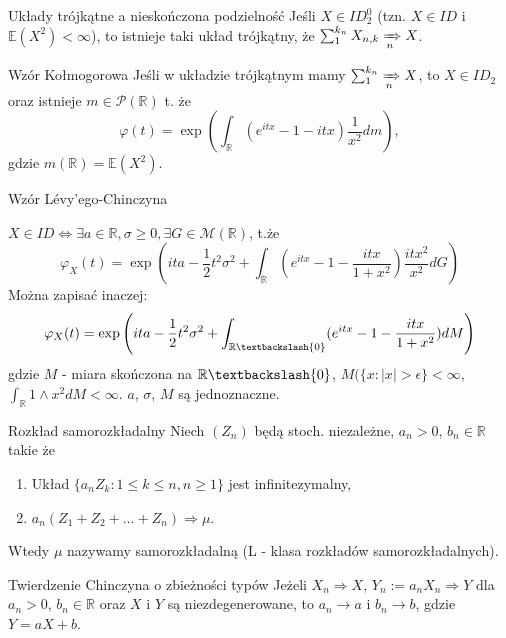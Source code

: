 \documentclass[avery5371, grid, frame]{flashcards}
\begin{document}
\begin{flashcard}[Twierdzenie]{Układy trójkątne a nieskończona podzielność}
    Jeśli $X \in ID_2^0$ (tzn. $X \in ID$ i $\mathbb{E}(X^2) < \infty$), to istnieje taki układ trójkątny, że $\sum_1^{k_n} X_{n, k} \xRightarrow[n]{} X$.
\end{flashcard}

\begin{flashcard}[Twierdzenie]{Wzór Kołmogorowa}
    Jeśli w układzie trójkątnym mamy $\sum_1^{k_n} \xRightarrow[n]{} X$, to $X \in ID_2$ oraz istnieje $m \in \mathcal{P}(\mathbb{R})$ t. że
    $$ \varphi(t) = \exp \left (\int_\mathbb{R} (e^{itx} - 1 - itx) \frac{1}{x^2} dm \right), $$ gdzie $m(\mathbb{R}) = \mathbb{E}(X^2)$.
\end{flashcard}

\begin{flashcard}[Twierdzenie]{Wzór L\'evy'ego-Chinczyna}
\begin{footnotesize}
    $X \in ID \iff \exists a \in \mathbb{R}, \sigma \geq 0, \exists G \in  \mathcal{M}(\mathbb{R})$, t.że
    $$ \varphi_X(t) = \exp \left (ita - \frac{1}{2}t^2\sigma^2 + \int_\mathbb{R} (e^{itx} - 1 - \frac{itx}{1+x^2}) \frac{itx^2}{x^2} dG
    \right)$$
    Można zapisać inaczej:
    $$ \varphi_X(t) = \exp \left (ita - \frac{1}{2}t^2\sigma^2 + \int_{\mathbb{R} \textbackslash \{ 0 \}} (e^{itx} - 1 - \frac{itx}{1+x^2}) dM
    \right)$$
    gdzie $M$ - miara skończona na $\mathbb{R} \textbackslash \{0\}$, $M( \{ x : |x| > \epsilon\} < \infty$, $\int_{\mathbb{R}} 1 \wedge x^2 dM < \infty$. $a$, $\sigma$, $M$ są jednoznaczne.
\end{footnotesize}
\end{flashcard}

\begin{flashcard}[Definicja]{Rozkład samorozkładalny}
    Niech $(Z_n)$ będą stoch. niezależne, $a_n > 0$, $b_n \in \mathbb{R}$ takie że
    \begin{enumerate}
        \item Układ $\{a_n Z_k : 1 \leq k \leq n, n \geq 1 \}$ jest infinitezymalny,
        \item $a_n(Z_1 + Z_2 + \dots + Z_n) \Rightarrow \mu$.
    \end{enumerate}
    Wtedy $\mu$ nazywamy samorozkładalną (L - klasa rozkładów samorozkładalnych).
\end{flashcard}

\begin{flashcard}[Twierdzenie]{Twierdzenie Chinczyna o zbieżności typów}
    Jeżeli $X_n \Rightarrow X$, $Y_n := a_n X_n \Rightarrow Y$ dla $a_n > 0$, $b_n \in \mathbb{R}$ oraz $X$ i $Y$ są niezdegenerowane, to $a_n \rightarrow a$ i $b_n \rightarrow b$, gdzie $Y = aX + b$.
\end{flashcard}
\end{document}
